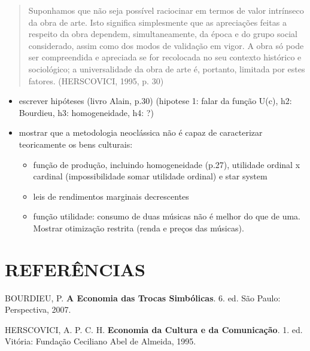\documentclass[
]{article}
\providecommand{\tightlist}{%
  \setlength{\itemsep}{0pt}\setlength{\parskip}{0pt}}
\newlength{\cslhangindent}
\newlength{\cslentryspacingunit} %
\newenvironment{CSLReferences}[2] %
 {%
  \setlength{\parindent}{0pt}
  \ifodd #1
  \let\oldpar\par
  \def\par{\hangindent=\cslhangindent\oldpar}
  \fi
  \setlength{\parskip}{#2\cslentryspacingunit}
 }%
 {}
\begin{document}
\begin{quote}
Suponhamos que não seja possível raciocinar em termos de valor
intrínseco da obra de arte. Isto significa simplesmente que as
apreciações feitas a respeito da obra dependem, simultaneamente, da
época e do grupo social considerado, assim como dos modos de validação
em vigor. A obra só pode ser compreendida e apreciada se for recolocada
no seu contexto histórico e sociológico; a universalidade da obra de
arte é, portanto, limitada por estes fatores. (HERSCOVICI, 1995, p. 30)
\end{quote}

\begin{itemize}
\tightlist
\item
  escrever hipóteses (livro Alain, p.30) (hipotese 1: falar da função
  U(c), h2: Bourdieu, h3: homogeneidade, h4: ?)
\item
  mostrar que a metodologia neoclássica não é capaz de caracterizar
  teoricamente os bens culturais:

  \begin{itemize}
  \tightlist
  \item
    função de produção, incluindo homogeneidade (p.27), utilidade
    ordinal x cardinal (impossibilidade somar utilidade ordinal) e star
    system
  \item
    leis de rendimentos marginais decrescentes
  \item
    função utilidade: consumo de duas músicas não é melhor do que de
    uma. Mostrar otimização restrita (renda e preços das músicas).
  \end{itemize}
\end{itemize}

\hypertarget{referuxeancias}{%
\section*{REFERÊNCIAS}\label{referuxeancias}}

\hypertarget{refs}{}
\begin{CSLReferences}{0}{1}
\leavevmode{}%
BOURDIEU, P. \textbf{A Economia das Trocas Simbólicas}. 6. ed. São
Paulo: Perspectiva, 2007.

\leavevmode{}%
HERSCOVICI, A. P. C. H. \textbf{Economia da Cultura e da Comunicação}.
1. ed. Vitória: Fundação Ceciliano Abel de Almeida, 1995.

\end{CSLReferences}
\end{document}
